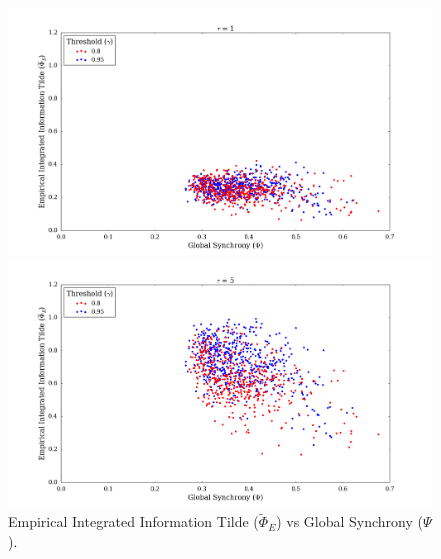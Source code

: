 \documentclass[a4paper,11pt]{article}
\begin{document}
\begin{figure}[H] 
	\begin{minipage}[b]{0.5\linewidth}
		\begin{center}
		\includegraphics[scale = 0.2]{figures/snn/phi_tilde_vs_psi_1}
		\end{center}
		\vspace{4ex}
	\end{minipage}
	\begin{minipage}[b]{0.5\linewidth}
		\begin{center}
		\includegraphics[scale = 0.2]{figures/snn/phi_tilde_vs_psi_5}
		\end{center}
		\vspace{4ex}
	\end{minipage}
	\caption{
		Empirical Integrated Information Tilde ($\widetilde{\Phi}_E$) vs Global Synchrony ($\Psi$).
		\label{fig:phi_tilde_vs_psi}
	}
\end{figure}
\end{document}
